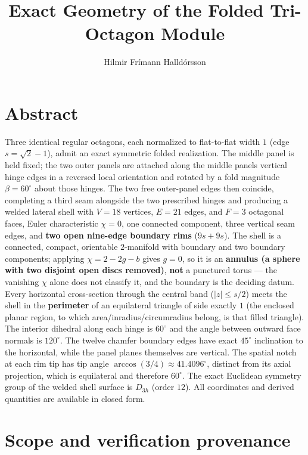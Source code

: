 \documentclass[
  11pt,
  a4paper,
]{article}
\title{Exact Geometry of the Folded Tri-Octagon Module}
\author{Hilmir Frímann Halldórsson}
\date{}
\begin{document}
\maketitle

\section{Abstract}\label{abstract}

Three identical regular octagons, each normalized to flat-to-flat width \(1\) (edge \(s=\sqrt2-1\)), admit an exact symmetric folded realization. The middle panel is held fixed; the two outer panels are attached along the middle panel\textquotesingle s vertical hinge edges in a reversed local orientation and rotated by a fold magnitude \(\beta=60^\circ\) about those hinges. The two free outer-panel edges then coincide, completing a third seam alongside the two prescribed hinges and producing a welded lateral shell with \(V=18\) vertices, \(E=21\) edges, and \(F=3\) octagonal faces, Euler characteristic \(\chi=0\), one connected component, three vertical seam edges, and \textbf{two open nine-edge boundary rims} (\(9s+9s\)). The shell is a connected, compact, orientable \(2\)-manifold with boundary and two boundary components; applying \(\chi=2-2g-b\) gives \(g=0\), so it is an \textbf{annulus (a sphere with two disjoint open discs removed)}, \textbf{not} a punctured torus --- the vanishing \(\chi\) alone does not classify it, and the boundary is the deciding datum. Every horizontal cross-section through the central band (\(|z|\le s/2\)) meets the shell in the \textbf{perimeter} of an equilateral triangle of side exactly \(1\) (the enclosed planar region, to which area/inradius/circumradius belong, is that filled triangle). The interior dihedral along each hinge is \(60^\circ\) and the angle between outward face normals is \(120^\circ\). The twelve chamfer boundary edges have exact \(45^\circ\) inclination to the horizontal, while the panel planes themselves are vertical. The spatial notch at each rim tip has tip angle \(\arccos(3/4)\approx41.4096^\circ\), distinct from its axial projection, which is equilateral and therefore \(60^\circ\). The exact Euclidean symmetry group of the welded shell surface is \(D_{3h}\) (order \(12\)). All coordinates and derived quantities are available in closed form.

\clearpage

\section{Scope and verification provenance}\label{scope-and-verification-provenance}
\end{document}
